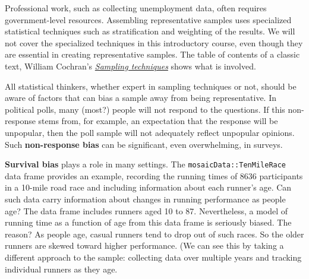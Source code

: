 \documentclass[
  letterpaper,
  DIV=11,
  numbers=noendperiod,
  oneside]{scrreprt}
\begin{document}
Professional work, such as collecting unemployment data, often requires
government-level resources. Assembling representative samples uses
specialized statistical techniques such as stratification and weighting
of the results. We will not cover the specialized techniques in this
introductory course, even though they are essential in creating
representative samples. The table of contents of a classic text, William
Cochran's
\href{https://ia801409.us.archive.org/35/items/Cochran1977SamplingTechniques_201703/Cochran_1977_Sampling\%20Techniques.pdf}{\emph{Sampling
techniques}} shows what is involved.

All statistical thinkers, whether expert in sampling techniques or not,
should be aware of factors that can bias a sample away from being
representative. In political polls, many (most?) people will not respond
to the questions. If this non-response stems from, for example, an
expectation that the response will be unpopular, then the poll sample
will not adequately reflect unpopular opinions. Such
\textbf{non-response bias} can be significant, even overwhelming, in
surveys.

\textbf{Survival bias} plays a role in many settings. The
\texttt{mosaicData::TenMileRace} data frame provides an example,
recording the running times of 8636 participants in a 10-mile road race
and including information about each runner's age. Can such data carry
information about changes in running performance as people age? The data
frame includes runners aged 10 to 87. Nevertheless, a model of running
time as a function of age from this data frame is seriously biased. The
reason? As people age, casual runners tend to drop out of such races. So
the older runners are skewed toward higher performance. (We can see this
by taking a different approach to the sample: collecting data over
multiple years and tracking individual runners as they age.
\end{document}
